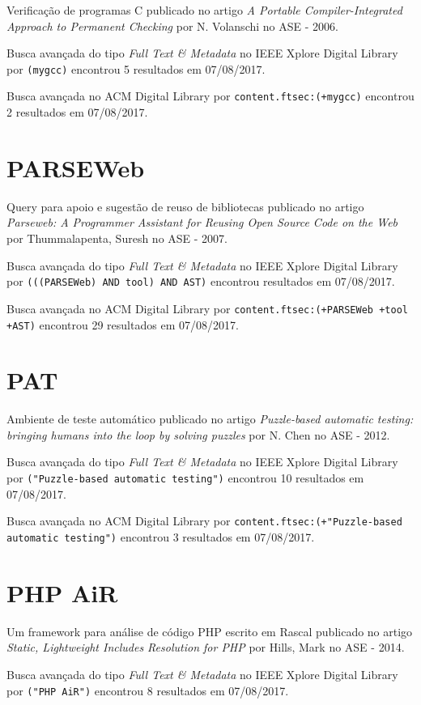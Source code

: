Verificação de programas C
publicado no artigo
{\it A Portable Compiler-Integrated Approach to Permanent Checking}
por
N. Volanschi
no
ASE
-
2006.

Busca avançada do tipo {\it Full Text \& Metadata} no IEEE Xplore Digital Library por
\texttt{(mygcc)}
encontrou
5 resultados em
07/08/2017.

Busca avançada no ACM Digital Library por
\texttt{content.ftsec:(+mygcc)}
encontrou
2 resultados em
07/08/2017.

\section{PARSEWeb}

Query para apoio e sugestão de reuso de bibliotecas
publicado no artigo
{\it Parseweb: A Programmer Assistant for Reusing Open Source Code on the Web}
por
Thummalapenta, Suresh
no
ASE
-
2007.

Busca avançada do tipo {\it Full Text \& Metadata} no IEEE Xplore Digital Library por
\texttt{(((PARSEWeb) AND tool) AND AST)}
encontrou
 resultados em
07/08/2017.

Busca avançada no ACM Digital Library por
\texttt{content.ftsec:(+PARSEWeb +tool +AST)}
encontrou
29 resultados em
07/08/2017.

\section{PAT}

Ambiente de teste automático
publicado no artigo
{\it Puzzle-based automatic testing: bringing humans into the loop by solving puzzles}
por
N. Chen
no
ASE
-
2012.

Busca avançada do tipo {\it Full Text \& Metadata} no IEEE Xplore Digital Library por
\texttt{("Puzzle-based automatic testing")}
encontrou
10 resultados em
07/08/2017.

Busca avançada no ACM Digital Library por
\texttt{content.ftsec:(+"Puzzle-based automatic testing")}
encontrou
3 resultados em
07/08/2017.

\section{PHP AiR}

Um framework para análise de código PHP escrito em Rascal
publicado no artigo
{\it Static, Lightweight Includes Resolution for PHP}
por
Hills, Mark
no
ASE
-
2014.

Busca avançada do tipo {\it Full Text \& Metadata} no IEEE Xplore Digital Library por
\texttt{("PHP AiR")}
encontrou
8 resultados em
07/08/2017.

